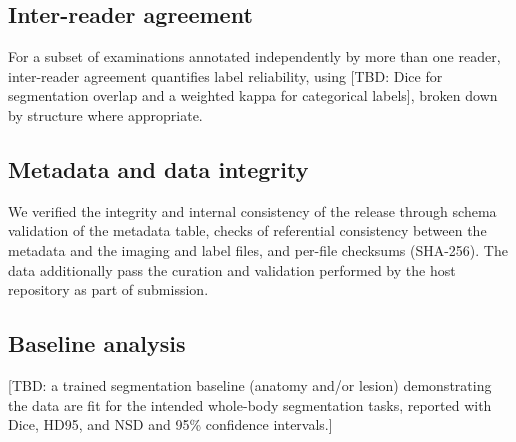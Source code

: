 \subsection*{Inter-reader agreement}\label{subsec:agreement}
For a subset of examinations annotated independently by more than one reader, inter-reader agreement quantifies label reliability, using [TBD: Dice for segmentation overlap and a weighted kappa for categorical labels], broken down by structure where appropriate.

\subsection*{Metadata and data integrity}\label{subsec:integrity}
We verified the integrity and internal consistency of the release through schema validation of the metadata table, checks of referential consistency between the metadata and the imaging and label files, and per-file checksums (SHA-256).
The data additionally pass the curation and validation performed by the host repository as part of submission.

\subsection*{Baseline analysis}\label{subsec:baseline}
[TBD: a trained segmentation baseline (anatomy and/or lesion) demonstrating the data are fit for the intended whole-body segmentation tasks, reported with Dice, HD95, and NSD and 95\% confidence intervals.]
